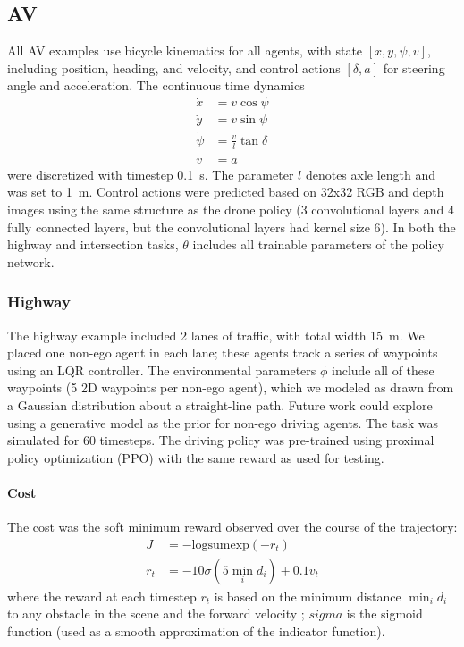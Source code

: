 \subsection{AV}

All AV examples use bicycle kinematics for all agents, with state $[x, y, \psi, v]$, including position, heading, and velocity, and control actions $[\delta, a]$ for steering angle and acceleration. The continuous time dynamics
\begin{align}
    \dot{x}    & = v \cos\psi             \\
    \dot{y}    & = v \sin\psi             \\
    \dot{\psi} & = \frac{v}{l} \tan\delta \\
    \dot{v}    & = a
\end{align}
were discretized with timestep \SI{0.1}{s}. The parameter $l$ denotes axle length and was set to \SI{1}{m}. Control actions were predicted based on 32x32 RGB and depth images using the same structure as the drone policy (3 convolutional layers and 4 fully connected layers, but the convolutional layers had kernel size 6). In both the highway and intersection tasks, $\theta$ includes all trainable parameters of the policy network.

\subsubsection{Highway}

The highway example included 2 lanes of traffic, with total width \SI{15}{m}. We placed one non-ego agent in each lane; these agents track a series of waypoints using an LQR controller. The environmental parameters $\phi$ include all of these waypoints (5 2D waypoints per non-ego agent), which we modeled as drawn from a Gaussian distribution about a straight-line path. Future work could explore using a generative model as the prior for non-ego driving agents. The task was simulated for 60 timesteps. The driving policy was pre-trained using proximal policy optimization (PPO) with the same reward as used for testing.

\paragraph{Cost} The cost was the soft minimum reward observed over the course of the trajectory:
\begin{align}
    J   & = -\text{logsumexp}(-r_t)            \\
    r_t & = -10 \sigma(5 \min_i d_i) + 0.1 v_t
\end{align}
where the reward at each timestep $r_t$ is based on the minimum distance $\min_i d_i$ to any obstacle in the scene and the forward velocity ; $sigma$ is the sigmoid function (used as a smooth approximation of the indicator function).

